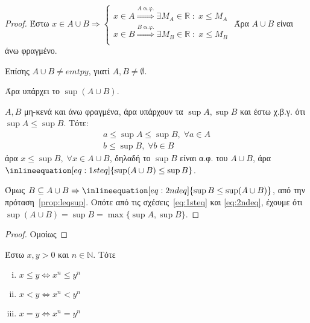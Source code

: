 \documentclass[main.tex]{subfiles}
\begin{document}

\begin{proof}
    Έστω $ x \in A \cup B \Rightarrow \begin{cases} x \in A \overset{A \; \text{α.φ.}}{
        \Rightarrow} \exists M_{A} \in \mathbb{R} \; : \; x \leq M_{A} \\
        x \in B \overset{B \; \text{α.φ.}}{ \Rightarrow} \exists M_{B} \in \mathbb{R} 
        \; : \; x \leq M_{B}  \\
    \end{cases} $  
    Άρα $ A \cup B $ είναι άνω φραγμένο.

    Επίσης $ A \cup B \neq emtpy $, γιατί $ A, B \neq \emptyset $. 

    Άρα υπάρχει το $ \sup (A \cup B) $.

    $ A,B $ μη-κενά και άνω φραγμένα, άρα υπάρχουν τα $ \sup A, \sup B $ 
    και έστω χ.β.γ.  ότι $ \sup A \leq \sup B $. Τότε:
    \begin{gather*}
        a \leq \sup A \leq \sup B, \; \forall a \in A \\
        b \leq \sup B, \; \forall b \in B 
    \end{gather*}
    άρα $ x \leq \sup B, \; \forall x \in A \cup B  $, δηλαδή το $ \sup B $ 
    είναι α.φ. του $ A \cup B $, άρα $ \inlineequation[eq:1steq]{\sup (A \cup B) 
    \leq \sup B} $.

    Όμως $ B \subseteq A \cup B \Rightarrow \inlineequation[eq:2ndeq]{\sup B \leq 
    \sup (A \cup B)} $, από την πρόταση~\ref{prop:leqsup}. 
    Οπότε από τις σχέσεις~\eqref{eq:1steq} και \eqref{eq:2ndeq}, έχουμε ότι $
    \sup (A \cup B) = \sup B = \max \{ \sup A, \sup B \} $.
\end{proof}


\begin{proof}
    Ομοίως
\end{proof}

\begin{lem}\label{lem:ineqs}
    Έστω $ x,y >0 $ και $ n \in \mathbb{N} $. Τότε
    \begin{enumerate}[i)]
        \item $ x \leq y \Leftrightarrow x^{n} \leq y^{n} $
        \item $ x < y \Leftrightarrow x^{n} < y^{n} $ \label{lem:ineqreal2}
        \item $ x = y \Leftrightarrow x^{n} = y^{n} $ \label{lem:ineqreal3}
    \end{enumerate}
\end{lem}
\end{document}
